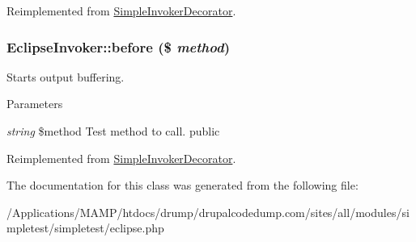 Reimplemented from \hyperlink{class_simple_invoker_decorator_a7b4b69f4e499f4e15c52e57542c52d7e}{SimpleInvokerDecorator}.\hypertarget{class_eclipse_invoker_a0f16409fb93e1e0e1d6ff703a0f9f1cf}{
\subsubsection[{before}]{\setlength{\rightskip}{0pt plus 5cm}EclipseInvoker::before (\$ {\em method})}}
\label{class_eclipse_invoker_a0f16409fb93e1e0e1d6ff703a0f9f1cf}
Starts output buffering. 
\begin{DoxyParams}{Parameters}
\item[{\em string}]\$method Test method to call.  public \end{DoxyParams}


Reimplemented from \hyperlink{class_simple_invoker_decorator_affaed9e6d8d366064589bbcdae7a6f15}{SimpleInvokerDecorator}.

The documentation for this class was generated from the following file:\begin{DoxyCompactItemize}
\item 
/Applications/MAMP/htdocs/drump/drupalcodedump.com/sites/all/modules/simpletest/simpletest/eclipse.php\end{DoxyCompactItemize}
